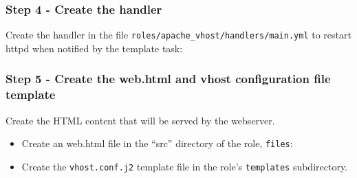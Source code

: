 \hypertarget{step-4---create-the-handler}{%
\subsubsection{Step 4 - Create the
handler}\label{step-4---create-the-handler}}

Create the handler in the file
\texttt{roles/apache\_vhost/handlers/main.yml} to restart httpd when
notified by the template task:

\begin{Shaded}
\begin{Highlighting}[]
\PreprocessorTok{{-}{-}{-}}
\KeywordTok{{-}}\AttributeTok{ }\KeywordTok{:}
\AttributeTok{  }\KeywordTok{:}
\AttributeTok{    }\KeywordTok{:}
\AttributeTok{    }\KeywordTok{:}
\end{Highlighting}
\end{Shaded}

\hypertarget{step-5---create-the-web.html-and-vhost-configuration-file-template}{%
\subsubsection{Step 5 - Create the web.html and vhost configuration file
template}\label{step-5---create-the-web.html-and-vhost-configuration-file-template}}

Create the HTML content that will be served by the webserver.

\begin{itemize}
\tightlist
\item
  Create an web.html file in the ``src'' directory of the role,
  \texttt{files}:
\end{itemize}

\begin{Shaded}
\begin{Highlighting}[]
\end{Highlighting}
\end{Shaded}

\begin{itemize}
\tightlist
\item
  Create the \texttt{vhost.conf.j2} template file in the role's
  \texttt{templates} subdirectory.
\end{itemize}

